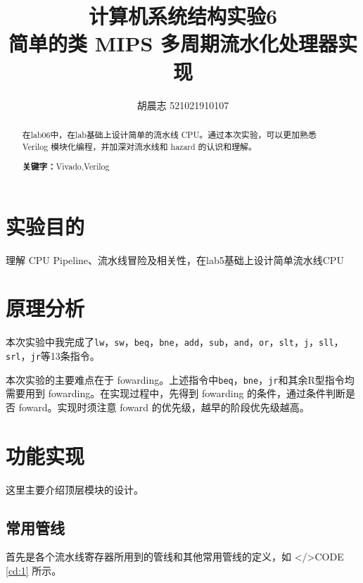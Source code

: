 \documentclass{progartcn}
\title{\bfseries\sffamily
  计算机系统结构实验6 \\ 简单的类 MIPS 多周期流水化处理器实现
}
\author{胡晨志 521021910107}
\date{}
\begin{document}
\sloppy %


\maketitle
\thispagestyle{empty}

\begin{abstract}
\noindent 在lab06中，在lab基础上设计简单的流水线 CPU。通过本次实验，可以更加熟悉 Verilog 模块化编程，并加深对流水线和 hazard 的认识和理解。

\vspace{2ex}
\noindent \textbf{关键字：}Vivado,\hspace{.5em}Verilog
\end{abstract}



\section{实验目的}

理解 CPU Pipeline、流水线冒险及相关性，在lab5基础上设计简单流水线CPU

\section{原理分析}

本次实验中我完成了\verb|lw|，\verb|sw|，\verb|beq|，\verb|bne|，\verb|add|，\verb|sub|，\verb|and|，\verb|or|，\verb|slt|，\verb|j|，\verb|sll|，\verb|srl|，\verb|jr|等13条指令。

本次实验的主要难点在于 fowarding。上述指令中\verb|beq|，\verb|bne|，\verb|jr|和其余R型指令均需要用到 fowarding。在实现过程中，先得到 fowarding 的条件，通过条件判断是否 foward。实现时须注意 foward 的优先级，越早的阶段优先级越高。

\section{功能实现}

这里主要介绍顶层模块的设计。

\subsection{常用管线}

首先是各个流水线寄存器所用到的管线和其他常用管线的定义，如 </>CODE \ref{cd:1} 所示。
\end{document}
